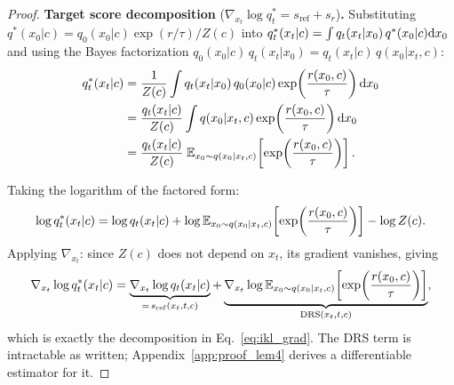 \begin{proof}
\textbf{Target score decomposition} ($\nabla_{x_t}\log q_t^* = s_{\mathrm{ref}} + s_r$)\textbf{.}
Substituting $q^*(x_0|c) = q_0(x_0|c)\exp(r/\tau)/Z(c)$ into $q_t^*(x_t|c)=\int q_t(x_t|x_0)\,q^*(x_0|c)\mathrm{d} x_0$ and using the Bayes factorization $q_0(x_0|c)\,q_t(x_t|x_0)=q_t(x_t|c)\,q(x_0|x_t,c)$:
\begin{align}
q_t^*(x_t|c)
&= \frac{1}{Z(c)}\int q_t(x_t|x_0)\,q_0(x_0|c)\exp\!\left(\frac{r(x_0,c)}{\tau}\right)\mathrm{d} x_0 \nonumber\\
&= \frac{q_t(x_t|c)}{Z(c)}\int q(x_0|x_t,c)\exp\!\left(\frac{r(x_0,c)}{\tau}\right)\mathrm{d} x_0 \nonumber\\
&= \frac{q_t(x_t|c)}{Z(c)}\;\mathbb{E}_{x_0\sim q(x_0|x_t,c)}\!\left[\exp\!\left(\frac{r(x_0,c)}{\tau}\right)\right].
\end{align}

Taking the logarithm of the factored form:
\begin{equation}
\log q_t^*(x_t|c) = \log q_t(x_t|c) + \log\mathbb{E}_{x_0\sim q(x_0|x_t,c)}\!\left[\exp\!\left(\frac{r(x_0,c)}{\tau}\right)\right] - \log Z(c).
\end{equation}
Applying $\nabla_{x_t}$: since $Z(c)$ does not depend on $x_t$, its gradient vanishes, giving
\begin{equation}
\nabla_{x_t}\log q_t^*(x_t|c)
= \underbrace{\nabla_{x_t}\log q_t(x_t|c)}_{=\,s_{\mathrm{ref}}(x_t,t,c)}
+ \underbrace{\nabla_{x_t}\log\mathbb{E}_{x_0\sim q(x_0|x_t,c)}\!\left[\exp\!\left(\frac{r(x_0,c)}{\tau}\right)\right]}_{\mathrm{DRS}(x_t,t,c)},
\end{equation}
which is exactly the decomposition in Eq.~\eqref{eq:ikl_grad}. The DRS term is intractable as written; Appendix~\ref{app:proof_lem4} derives a differentiable estimator for it.
\end{proof}

